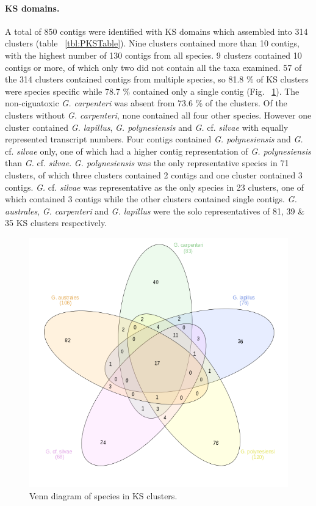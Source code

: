 \documentclass[12pt]{article}
\begin{document}
\paragraph*{KS domains.}
\FloatBarrier
A total of 850 contigs were identified with KS domains which assembled into 314 clusters (table ~\ref{tbl:PKSTable}). 
Nine clusters contained more than 10 contigs, with the highest number of 130 contigs from all species.
9 clusters contained 10 contigs or more, of which only two did not contain all the taxa examined.
57 of the 314 clusters contained contigs from multiple species, so 81.8 \% of KS clusters were species specific while 78.7 \% contained only a single contig (Fig. ~\ref{fig:KSVenn}). 
The non-ciguatoxic \textit{G. carpenteri} was absent from 73.6 \% of the clusters. 
Of the clusters without \textit{G. carpenteri}, none contained all four other species. 
However one cluster contained \textit{G. lapillus}, \textit{G. polynesiensis} and \emph{G.} cf. \emph{silvae} with equally represented transcript numbers. 
Four contigs contained \textit{G. polynesiensis} and \emph{G.} cf. \emph{silvae} only, one of which had a higher contig representation of \textit{G. polynesiensis} than \emph{G.} cf. \emph{silvae}. 
\textit{G. polynesiensis} was the only representative species in 71 clusters, of which three clusters contained 2 contigs and one cluster contained 3 contigs. 
\emph{G.} cf. \emph{silvae} was representative as the only species in 23 clusters, one of which contained 3 contigs while the other clusters contained single contigs.
\textit{G. australes}, \textit{G. carpenteri} and \textit{G. lapillus} were the solo representatives of 81, 39 \& 35 KS clusters respectively. \\
\begin{figure} 
\includegraphics[scale=1]{3Aug18_cluster-investigation/pks/KS-venn.png} 
\caption{Venn diagram of species in KS clusters.} 
\label{fig:KSVenn}
\end{figure} 
\FloatBarrier
\end{document}
